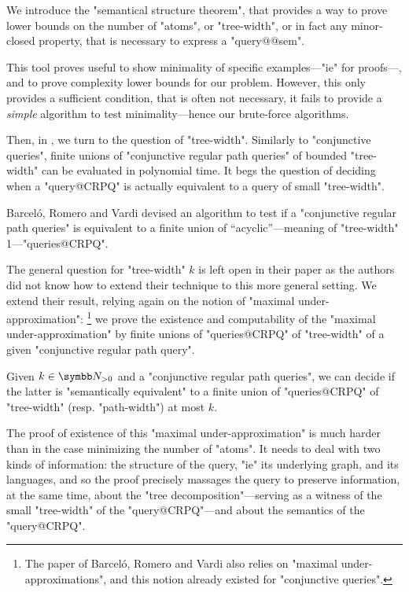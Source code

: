 \begin{contribution}
	We introduce the "semantical structure theorem", that provides
	a way to prove lower bounds on the number
	of "atoms", or "tree-width", or in fact any minor-closed property,
	that is necessary to express a "query@@sem".
\end{contribution}

This tool proves useful to show minimality of specific examples---"ie"
for proofs---, and to prove complexity lower bounds for our problem.
However, this only provides a sufficient condition, that is often not
necessary, it fails to provide a \emph{simple} algorithm to test minimality---hence our
brute-force algorithms.

\bigskip
Then, in , we turn to the question
of "tree-width". Similarly to "conjunctive queries", finite unions of
"conjunctive regular path queries"
of bounded "tree-width" can be evaluated in polynomial time.
It begs the question of deciding when a "query@CRPQ" is actually equivalent
to a query of small "tree-width".

\begin{known}
	Barceló, Romero and Vardi \cite{BarceloRomeroVardi2016SemanticAcyclicity}
	devised an algorithm to test
	if a "conjunctive regular path queries" is equivalent to
	a finite union of ``acyclic''---meaning of "tree-width" 1---"queries@CRPQ".
\end{known}

The general question for "tree-width" $k$ is left open in their paper as the authors did not know how to extend their technique to this
more general setting. We extend their result, relying again on the notion
of "maximal under-approximation":%
\footnote{The paper of Barceló, Romero and Vardi
also relies on "maximal under-approximations", and this notion already existed
for "conjunctive queries".}
we prove the existence and computability of the "maximal under-approximation"
by finite unions of "queries@CRPQ" of "tree-width" of a given
"conjunctive regular path query".

\begin{contribution}
	Given $k\in \Np$ and a "conjunctive regular path queries",
	we can decide if the latter is "semantically equivalent"
	to a finite union of "queries@CRPQ" of "tree-width"
	(resp. "path-width") at most $k$.
\end{contribution}

The proof of existence of this "maximal under-approximation" is
much harder than in the case minimizing
the number of "atoms". It needs to deal with two kinds of information:
the structure of the query, "ie" its underlying graph, and its languages,
and so the proof precisely massages the query to
preserve information, at the same time, about the "tree decomposition"---serving as a
witness of the small "tree-width" of the "query@CRPQ"---and about the
semantics of the "query@CRPQ".

